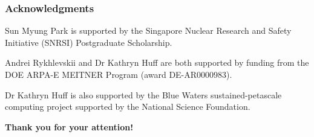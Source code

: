 \begin{frame}
	\frametitle{Acknowledgments}
    	Sun Myung Park is supported by the Singapore Nuclear Research and Safety
    	Initiative (SNRSI) Postgraduate Scholarship.
    	
    	\vspace{.3cm}
    	Andrei Rykhlevskii and Dr Kathryn Huff are both supported by funding from
    	the DOE ARPA-E MEITNER Program (award DE-AR0000983).
    	
    	\vspace{.3cm}
    	Dr Kathryn Huff is also supported by the Blue Waters sustained-petascale
    	computing project supported by the National Science Foundation.
\end{frame}

\begin{frame}
	\large
	\centering
	\textbf{Thank you for your attention!}
\end{frame}
